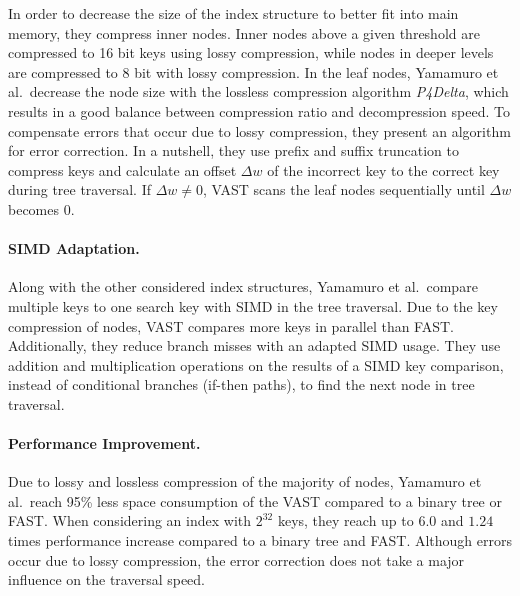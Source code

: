 \documentclass[runningheads,a4paper]{llncs}
\begin{document}
In order to decrease the size of the index structure to better fit into main memory, they compress inner nodes. Inner nodes above a given threshold are compressed to 16 bit keys using lossy compression, while nodes in deeper levels are compressed to 8 bit with lossy compression. In the leaf nodes, Yamamuro et al.\ decrease the node size with the lossless compression algorithm \emph{P4Delta}, which results in a good balance between compression ratio and decompression speed. To compensate errors that occur due to lossy compression, they present an algorithm for error correction. In a nutshell, they use prefix and suffix truncation to compress keys and calculate an offset $\Delta w$ of the incorrect key to the correct key during tree traversal. If $\Delta w\neq0$, VAST scans the leaf nodes sequentially until $\Delta w$ becomes $0$.


\paragraph{SIMD Adaptation.}
Along with the other considered index structures, Yamamuro et al.\ compare multiple keys to one search key with SIMD in the tree traversal. Due to the key compression of nodes, VAST compares more keys in parallel than FAST. Additionally, they reduce branch misses with an adapted SIMD usage. They use addition and multiplication operations on the results of a SIMD key comparison, instead of conditional branches (if-then paths), to find the next node in tree traversal.


\paragraph{Performance Improvement.}
Due to lossy and lossless compression of the majority of nodes, Yamamuro et al.\ reach 95\% less space consumption of the VAST compared to a binary tree or FAST. When considering an index with $2^{32}$ keys, they reach up to $6.0$ and $1.24$ times performance increase compared to a binary tree and FAST. Although errors occur due to lossy compression, the error correction does not take a major influence on the traversal speed.

\end{document}
